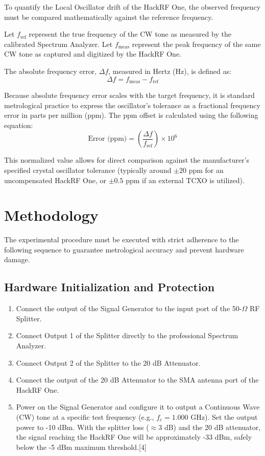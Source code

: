 \documentclass[journal, a4paper]{IEEEtran}
\begin{document}
To quantify the Local Oscillator drift of the HackRF One, the observed frequency must be compared mathematically against the reference frequency. 

Let $f_{\text{ref}}$ represent the true frequency of the CW tone as measured by the calibrated Spectrum Analyzer. Let $f_{\text{meas}}$ represent the peak frequency of the same CW tone as captured and digitized by the HackRF One. 

The absolute frequency error, $\Delta f$, measured in Hertz (Hz), is defined as:
\begin{equation}
\Delta f = f_{\text{meas}} - f_{\text{ref}}
\end{equation}

Because absolute frequency error scales with the target frequency, it is standard metrological practice to express the oscillator's tolerance as a fractional frequency error in parts per million (ppm). The ppm offset is calculated using the following equation:
\begin{equation}
\text{Error (ppm)} = \left( \frac{\Delta f}{f_{\text{ref}}} \right) \times 10^6
\end{equation}

This normalized value allows for direct comparison against the manufacturer's specified crystal oscillator tolerance (typically around $\pm20$ ppm for an uncompensated HackRF One, or $\pm0.5$ ppm if an external TCXO is utilized).

\section{Methodology}

The experimental procedure must be executed with strict adherence to the following sequence to guarantee metrological accuracy and prevent hardware damage.

\subsection{Hardware Initialization and Protection}
\begin{enumerate}
    \item Connect the output of the Signal Generator to the input port of the 50-$\Omega$ RF Splitter.
    \item Connect Output 1 of the Splitter directly to the professional Spectrum Analyzer.
    \item Connect Output 2 of the Splitter to the 20 dB Attenuator.
    \item Connect the output of the 20 dB Attenuator to the SMA antenna port of the HackRF One.
    \item Power on the Signal Generator and configure it to output a Continuous Wave (CW) tone at a specific test frequency (e.g., $f_c = 1.000$ GHz). Set the output power to -10 dBm. With the splitter loss ($\approx 3$ dB) and the 20 dB attenuator, the signal reaching the HackRF One will be approximately -33 dBm, safely below the -5 dBm maximum threshold.[4]
\end{enumerate}
\end{document}
